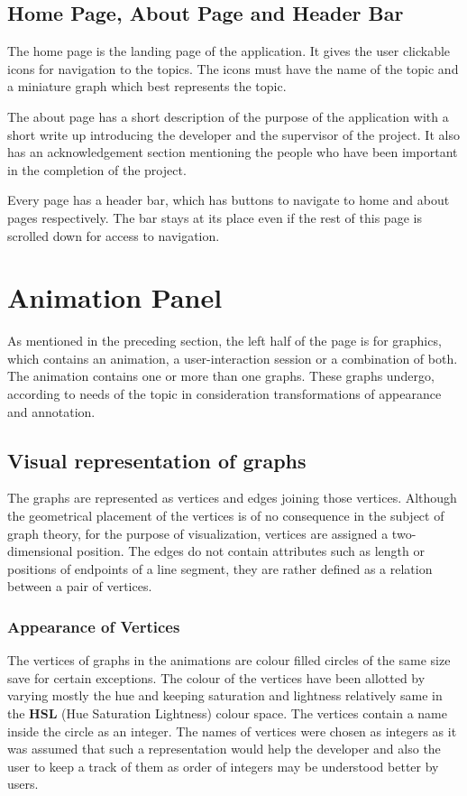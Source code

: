 \subsection{Home Page, About Page and Header Bar}
\label{design: home}

The home page is the landing page of the application. It gives the user
clickable icons for navigation to the topics. The icons must have the name of
the topic and a miniature graph which best represents the topic. 

The about page has a short description of the purpose of the application with a
short write up introducing the developer and the supervisor of the project. It
also has an acknowledgement section mentioning the people who have been important
in the completion of the project.

Every page has a header bar, which has buttons to navigate to home and about
pages respectively. The bar stays at its place even if the rest of this
page is scrolled down for access to navigation.

\section{Animation Panel} 
As mentioned in the preceding section, the left half of the page is for
graphics, which contains an animation, a user-interaction session or a
combination of both.  The animation contains one or more than one graphs. These
graphs undergo, according to needs of the topic in consideration
transformations of appearance and annotation.

\subsection{Visual representation of graphs} 
The graphs are represented as vertices and edges joining those vertices.
Although the geometrical placement of the vertices is of no consequence in the
subject of graph theory, for the purpose of visualization, vertices are
assigned a two-dimensional position. The edges do not contain attributes such as
length or positions of endpoints of a line segment, they are rather defined as
a relation between a pair of vertices.

\subsubsection{Appearance of Vertices} 

The vertices of graphs in the animations are colour filled circles of the
same size save for certain exceptions. The colour of the vertices have been
allotted by varying mostly the hue and keeping saturation and lightness
relatively same in the \textbf{HSL} (Hue Saturation Lightness) colour space. The
vertices contain a name inside the circle as an integer. The names of vertices
were chosen as integers as it was assumed that such a representation would help
the developer and also the user to keep a track of them as order of integers
may be understood better by users.

